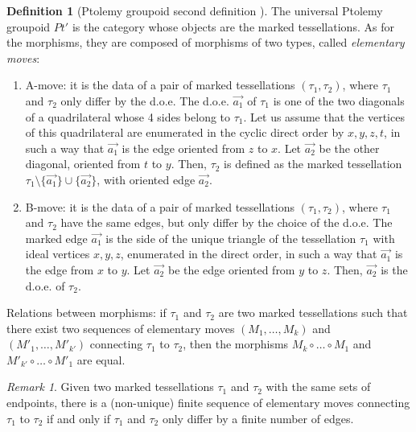 \documentclass[twoside]{irmaems}
\theoremstyle{plain}
\theoremstyle{definition}
\newtheorem{definition}{Definition}[section]
\theoremstyle{remark}
\newtheorem{remark}[theorem]{Remark}
\begin{document}
\begin{definition}[Ptolemy groupoid second definition \cite{pe0,pe}]
The universal Ptolemy groupoid   $Pt'$ is the category 
whose objects are the marked tessellations. As for the morphisms, 
they are composed of morphisms of two types, called {\em elementary moves}:
\begin{enumerate} 

\item A-move: it is the data of a pair of marked tessellations $(\tau_1, \tau_2)$, where $\tau_1$ and
 $\tau_2$ only differ by the  d.o.e. The d.o.e. $\vec{a_1}$ of $\tau_1$ 
 is one of the two diagonals of a quadrilateral whose 4 sides belong to  $\tau_1$. Let us assume 
 that the vertices of this quadrilateral 
 are 
 enumerated in the cyclic direct order by $x,y,z,t$, in such a way that  $\vec{a_1}$ 
 is the edge oriented from $z$ to $x$.  Let $\vec{a_2}$ be the other diagonal, oriented 
 from $t$ to $y$. Then, 
$\tau_2$ is defined as the marked tessellation 
  $\tau_1\setminus\{\vec{a_1}\}\cup \{\vec{a_2}\}$, with oriented edge
$\vec{a_{2}}$.


\item B-move: it is the data of a pair of marked tessellations 
$(\tau_1, \tau_2)$, where $\tau_1$ and $\tau_2$ have the same edges, but only differ 
by the choice of the d.o.e. The marked edge $\vec{a_1}$  
is the side of the unique triangle of the tessellation  $\tau_1$ with ideal vertices $x,y,z$, enumerated in the direct order, in such a way that $\vec{a_1}$ 
is the edge from $x$ to $y$. 
Let $\vec{a_2}$ be the  edge   
oriented from  $y$ to $z$. Then, $\vec{a_2}$ is the d.o.e. of $\tau_2$.
\end{enumerate}

\noindent 
Relations between morphisms: if $\tau_1$ and $\tau_2$ are two marked 
tessellations such that there exist two sequences of elementary moves 
$(M_1,\ldots, M_k)$ and  $(M'_1,\ldots, M'_{k'})$  connecting  $\tau_1$ to $\tau_2$, then 
the morphisms $M_k \circ \ldots \circ M_1$ and $M'_{k'}\circ \ldots \circ M'_1$ are equal. 

\end{definition}

\begin{remark}
Given two marked tessellations $\tau_{1}$ and $\tau_{2}$ with the same sets of endpoints, 
there is a (non-unique) finite sequence of elementary moves connecting $\tau_{1}$ to $\tau_{2}$ if and only if $\tau_{1}$ and $\tau_{2}$ only differ by a finite number of edges.
\end{remark}
\end{document}
